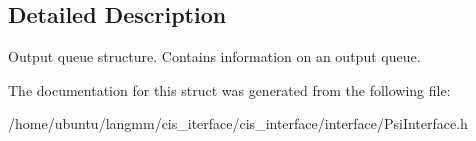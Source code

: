 \subsection{Detailed Description}
Output queue structure. Contains information on an output queue. 

The documentation for this struct was generated from the following file\+:\begin{DoxyCompactItemize}
\item 
/home/ubuntu/langmm/cis\+\_\+iterface/cis\+\_\+interface/interface/Psi\+Interface.\+h\end{DoxyCompactItemize}
